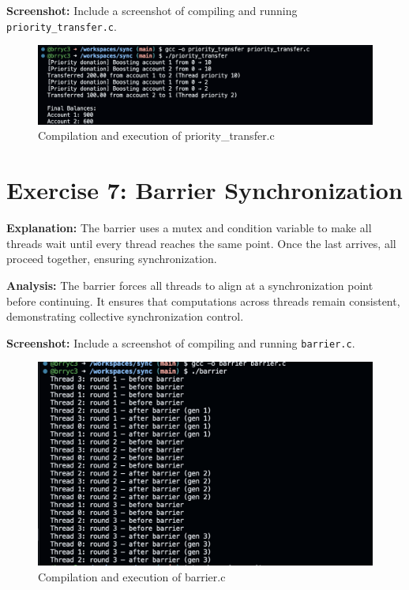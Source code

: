 \documentclass{article}
\begin{document}
\textbf{Screenshot:} Include a screenshot of compiling and running \texttt{priority\_transfer.c}.
\begin{figure}[h]
\centering
\includegraphics[width=\textwidth]{exercise6_screenshot.png}
\caption{Compilation and execution of priority\_transfer.c}
\end{figure}

\section{Exercise 7: Barrier Synchronization}


\textbf{Explanation:} The barrier uses a mutex and condition variable to make all threads wait until every thread reaches the same point. Once the last arrives, all proceed together, ensuring synchronization.

\textbf{Analysis:} The barrier forces all threads to align at a synchronization point before continuing. It ensures that computations across threads remain consistent, demonstrating collective synchronization control.

\textbf{Screenshot:} Include a screenshot of compiling and running \texttt{barrier.c}.
\begin{figure}[h]
\centering
\includegraphics[width=\textwidth]{exercise7_screenshot.png}
\caption{Compilation and execution of barrier.c}
\end{figure}
\end{document}
